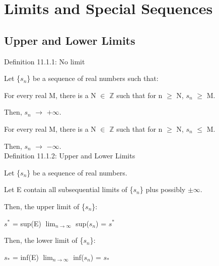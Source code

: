 \newpage

\section[Day 11: Limits \& Special Sequences]{Limits and Special Sequences}

\subsection{ Upper and Lower Limits } 

{ \color{blue} Definition 11.1.1: No limit } 

	\begin{adjustbox}{minipage=14cm, right, vspace=0.1cm 0cm}
		Let \{$s_n$\} be a sequence of real numbers such that:

		\hspace{1cm}
		For every real M, there is a N $\in$ $\mathbb{Z}$ such that
		for n $\geq$ N, $s_n$ $\geq$ M.

		\hspace{2cm}
		Then, $s_n$ $\rightarrow$ $+\infty$.

		\hspace{1cm}
		For every real M, there is a N $\in$ $\mathbb{Z}$ such that
		for n $\geq$ N, $s_n$ $\leq$ M.

		\hspace{2cm}
		Then, $s_n$ $\rightarrow$ $-\infty$. \\
	\end{adjustbox}

{ \color{blue} Definition 11.1.2: Upper and Lower Limits } 

	\begin{adjustbox}{minipage=14cm, right, vspace=0.1cm 0cm}
		Let \{$s_n$\} be a sequence of real numbers.

		Let E contain all subsequential limits of \{$s_n$\}
		plus possibly $\pm$$\infty$.

		Then, the upper limit of \{$s_n$\}:

		\hspace{1cm}
		$s^*$ = sup(E) \hspace{1cm} $\lim_{n \rightarrow \infty}$ sup($s_n$) = $s^*$

		Then, the lower limit of \{$s_n$\}:

		\hspace{1cm}
		$s_*$ = inf(E) \hspace{1.2cm} $\lim_{n \rightarrow \infty}$ inf($s_n$) = $s_*$ \\
	\end{adjustbox}

